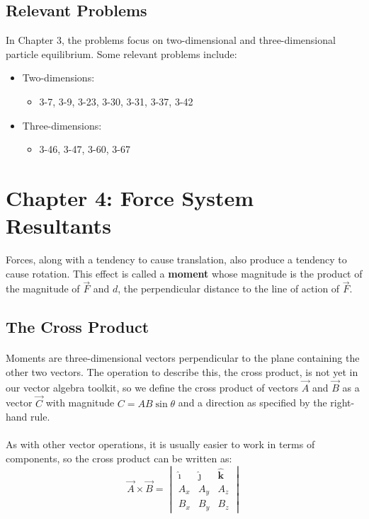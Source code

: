 \documentclass[12pt]{article}
\newcommand{\ihat}{\boldsymbol{\hat{\textbf{$\imath$}}}}
\newcommand{\jhat}{\boldsymbol{\hat{\textbf{$\jmath$}}}}
\newcommand{\khat}{\boldsymbol{\hat{\textbf{k}}}}
\begin{document}
\subsection{Relevant Problems}
In Chapter 3, the problems focus on two-dimensional and three-dimensional particle equilibrium.
Some relevant problems include:
\begin{itemize}
    \item Two-dimensions:
    \begin{itemize}
        \item 3-7, 3-9, 3-23, 3-30, 3-31, 3-37, 3-42
    \end{itemize}
    \item Three-dimensions:
    \begin{itemize}
        \item 3-46, 3-47, 3-60, 3-67
    \end{itemize}
\end{itemize}

\section{Chapter 4: Force System Resultants}
Forces, along with a tendency to cause translation, also produce a tendency to cause rotation.
This effect is called a \textbf{moment} whose magnitude is the product of the magnitude of $\vec{F}$ and $d$, the perpendicular distance to the line of action of $\vec{F}$.

\subsection{The Cross Product}
\paragraph{}
Moments are three-dimensional vectors perpendicular to the plane containing the other two vectors.
The operation to describe this, the cross product, is not yet in our vector algebra toolkit, so we define the cross product of vectors $\vec{A}$ and $\vec{B}$ as a vector $\vec{C}$ with magnitude $C = AB\sin{\theta}$ and a direction as specified by the right-hand rule.

\paragraph{}
As with other vector operations, it is usually easier to work in terms of components, so the cross product can be written as:
\begin{equation*}
    \vec{A} \times \vec{B} = 
    \begin{vmatrix}
        \ihat  & \jhat  & \khat \\
        A_x    & A_y    & A_z \\
        B_x    & B_y    & B_z
    \end{vmatrix}
\end{equation*}
\end{document}
